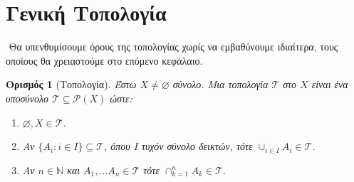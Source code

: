 \documentclass[oneside,a4paper]{article}
\newtheorem*{defn}{Ορισμός}
\newcommand{\Q}{\mathbb{Q}}
\begin{document}
\begin{center}
\end{center}




















\pagebreak
\section{Γενική Τοπολογία}



$ $\newline
Θα υπενθυμίσουμε όρους της τοπολογίας χωρίς να εμβαθύνουμε ιδιαίτερα, τους οποίους θα χρειαστούμε στο επόμενο κεφάλαιο.

\begin{defn}[Τοπολογία] Έστω $X \neq \varnothing$ σύνολο. Μια τοπολογία $\mathcal T$ στο $X$ είναι ένα υποσύνολο $\mathcal T \subseteq \mathcal P (X)$ ώστε:
	\begin{enumerate}
		\item $\varnothing, X \in \mathcal T$.
		\item Αν $\{A_i: i \in I\} \subseteq \mathcal T$, όπου $I$ τυχόν σύνολο δεικτών, τότε $\cup_{i \in I} A_i \in \mathcal T$.
		\item Αν $n\in \mathbb N$ και $A_1, \ldots A_n \in \mathcal T$ τότε $\cap_{k=1}^n A_k \in \mathcal T$.
	\end{enumerate}
\end{defn}
\end{document}
